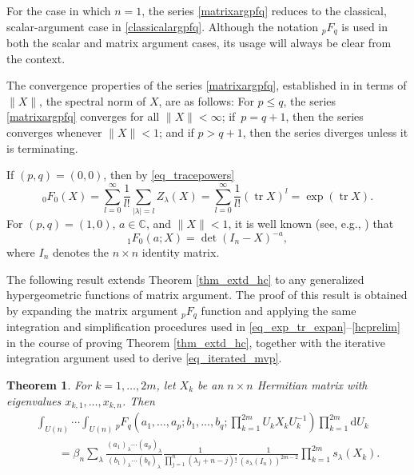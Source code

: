 \documentclass[10pt,a4paper]{amsart}
\numberwithin{equation}{section}
\newtheorem{Theorem}{Theorem}[section]
\def\C{{\mathbb C}}
\def\dd{ \mathrm{d}}
\def\tr{\operatorname{tr} }
\begin{document}
For the case in which $n = 1$, the series \eqref{matrixargpfq} reduces to the classical, scalar-argument case in \eqref{classicalargpfq}. Although the notation ${}_pF_q$ is used in both the scalar and matrix argument cases, its usage will always be clear from the context.

The convergence properties of the series \eqref{matrixargpfq}, established in \cite[Section 6]{grossrichards87} in terms of $\|X\|$, the spectral norm of $X$, are as follows: For $p \le q$, the series \eqref{matrixargpfq} converges for all $\|X\| < \infty$; if~${p = q+1}$, then the series converges whenever $\|X\| < 1$; and if $p > q+1$, then the series diverges unless it is terminating.

If $(p,q) = (0,0)$, then by \eqref{eq_tracepowers}
\begin{equation}
\label{eq_0F0}
{}_0F_0(X) = \sum_{l=0}^\infty \frac{1}{l!} \sum_{|\lambda|=l} Z_\lambda(X) = \sum_{l=0}^\infty \frac{1}{l!} (\tr X)^l = \exp(\tr X).
\end{equation}
For $(p,q) = (1,0)$, $a \in \C$, and $\|X\| < 1$, it is well known (see, e.g., \cite{grossrichards87,grossrichards89}) that
\begin{equation}
\label{eq_1F0}
{}_1F_0(a;X) = \det(I_n-X)^{-a},
\end{equation}
where $I_n$ denotes the $n \times n$ identity matrix.

The following result extends Theorem \ref{thm_extd_hc} to any generalized hypergeometric functions of matrix argument. The proof of this result is obtained by expanding the matrix argument ${}_pF_q$ function and applying the same integration and simplification procedures used in \eqref{eq_exp_tr_expan}--\eqref{hcprelim} in the course of proving Theorem \ref{thm_extd_hc}, together with the iterative integration argument used to derive \eqref{eq_iterated_mvp}.

\begin{Theorem}
\label{ghf-extendedpfq}
For $k=1,\dots,2m$, let $X_k$ be an $n \times n$ Hermitian matrix with eigenvalues $x_{k,1},\dots,x_{k,n}$. Then
\begin{gather}
\int_{U(n)} \cdots \int_{U(n)} {}_pF_q\left(a_1,\dots,a_p;b_1,\dots,b_q;\prod_{k=1}^{2m} U_k X_k U_k^{-1}\right) \prod_{k=1}^{2m} \dd U_k \nonumber\\
\qquad= \beta_n \sum_\lambda \frac{(a_1)_\lambda \cdots (a_p)_\lambda}{(b_1)_\lambda \cdots (b_q)_\lambda} \frac{1}{\prod_{j=1}^n (\lambda_j + n-j)!} \frac{1}{(s_\lambda(I_n))^{2m-2}} \prod_{k=1}^{2m} s_\lambda(X_k).\label{hcextendedpfq}
\end{gather}
\end{Theorem}
\end{document}
